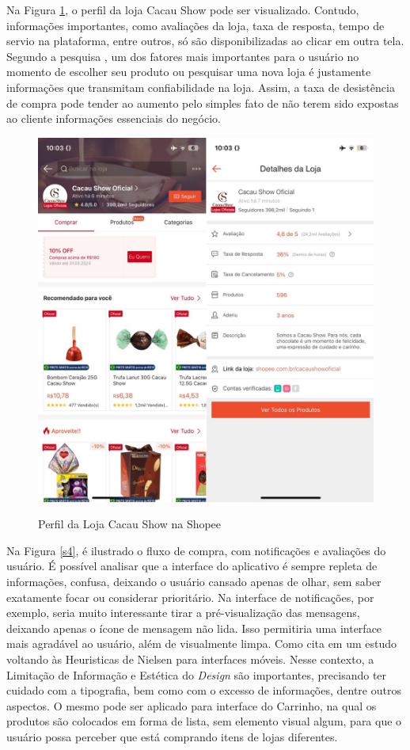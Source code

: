 Na Figura \ref{s3}, o perfil da loja Cacau Show pode ser visualizado. Contudo, informações importantes, como avaliações da loja, taxa de resposta, tempo de servio na plataforma, entre outros, só são disponibilizadas ao clicar em outra tela. Segundo a pesquisa , um dos fatores mais importantes para o usuário no momento de escolher seu produto ou pesquisar uma nova loja é justamente informações que transmitam confiabilidade na loja. Assim, a taxa de desistência de compra pode tender ao aumento pelo simples fato de não terem sido expostas ao cliente informações essenciais do negócio.

\begin{figure}[ht]
    \centering
    \caption{Perfil da Loja Cacau Show na Shopee}
    \includegraphics[keepaspectratio=true,scale=0.3]{figuras/shopee3.jpg}
    \label{s3}
\end{figure}

Na Figura \ref{s4}, é ilustrado o fluxo de compra, com notificações e avaliações do usuário. É possível analisar que a interface do aplicativo é sempre repleta de informações, confusa, deixando o usuário cansado apenas de olhar, sem saber exatamente focar ou considerar prioritário. Na interface de notificações, por exemplo, seria muito interessante tirar a pré-visualização das mensagens, deixando apenas o ícone de mensagem não lida. Isso permitiria uma interface mais agradável ao usuário, além de visualmente limpa. Como  cita em um estudo voltando às Heuristicas de Nielsen para interfaces móveis. Nesse contexto, a Limitação de Informação e Estética do \textit{Design} são importantes, precisando ter cuidado com a tipografia, bem como com o excesso de informações, dentre outros aspectos. O mesmo pode ser aplicado para interface do Carrinho, na qual os produtos são colocados em forma de lista, sem elemento visual algum, para que o usuário possa perceber que está comprando itens de lojas diferentes.

